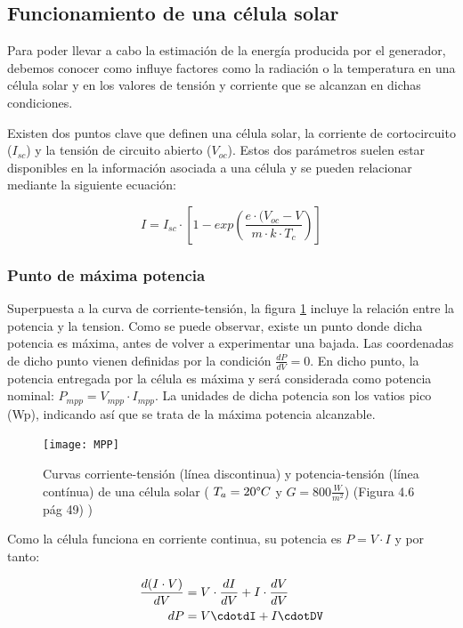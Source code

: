 \subsection{Funcionamiento de una célula solar}

Para poder llevar a cabo la estimación de la energía producida por el generador, debemos conocer como influye factores como la radiación o la temperatura en una célula solar y en los valores de tensión y corriente que se alcanzan en dichas condiciones.

Existen dos puntos clave que definen una célula solar, la corriente de cortocircuito ($I_{sc}$) y la tensión de circuito abierto ($V_{oc}$). 
Estos dos parámetros suelen estar disponibles en la información asociada a una célula y se pueden relacionar mediante la siguiente ecuación:

\begin{equation}
I = I_{sc} \cdot \left[ 1 - exp\left(\frac{e\cdot(V_{oc}-V}{m \cdot k \cdot T_c}\right)\right]
\end{equation}

\subsubsection{Punto de máxima potencia}

Superpuesta a la curva de corriente-tensión, la figura \ref{fig:mpp} incluye la relación entre la potencia y la tension. Como se puede observar, existe un punto donde dicha potencia es máxima, antes de volver a experimentar una bajada. Las coordenadas de dicho punto vienen definidas por la condición $\frac{dP}{dV} = 0$. En dicho punto, la potencia entregada por la célula es máxima y será considerada como potencia nominal: $P_{mpp} = V_{mpp} \cdot I_{mpp}$. La unidades de dicha potencia son los vatios pico (Wp), indicando así que se trata de la máxima potencia alcanzable.\\

\begin{figure}[ht]
\texttt{[image: MPP]}
\centering
\caption{Curvas corriente-tensión (línea discontinua) y potencia-tensión (línea contínua) de una célula solar ( $T_a=20\degree C$ y $G=800 \frac{W}{m^2}$) (Figura 4.6 pág 49) \cite{esf_book})}
\label{fig:mpp}
\end{figure}


Como la célula funciona en corriente continua, su potencia es $ P = V \cdot I $ y por tanto:

\begin{equation}
\begin{align}
\frac{d(I \cdot V)}{dV} &= V \cdot \frac {dI}{dV}+I\cdot\frac{dV}{dV}\\
dP &= V\cdotdI+I\cdotDV
\end{align}
\end{equation}


